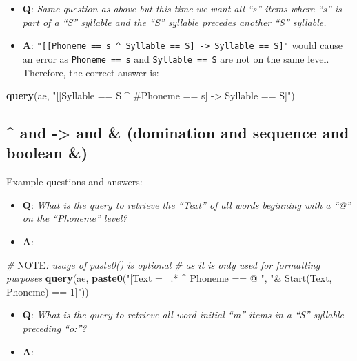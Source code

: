\documentclass[]{book}
\newenvironment{Shaded}{\begin{snugshade}}{\end{snugshade}}
\newcommand{\AlertTok}[1]{\textcolor[rgb]{0.94,0.16,0.16}{#1}}
\newcommand{\CommentTok}[1]{\textcolor[rgb]{0.56,0.35,0.01}{\textit{#1}}}
\newcommand{\KeywordTok}[1]{\textcolor[rgb]{0.13,0.29,0.53}{\textbf{#1}}}
\newcommand{\NormalTok}[1]{#1}
\newcommand{\StringTok}[1]{\textcolor[rgb]{0.31,0.60,0.02}{#1}}
\providecommand{\tightlist}{%
  \setlength{\itemsep}{0pt}\setlength{\parskip}{0pt}}
\begin{document}
\begin{itemize}
\tightlist
\item
  \textbf{Q}: \emph{Same question as above but this time we want all ``s'' items where ``s'' is part of a ``S'' syllable and the ``S'' syllable precedes another ``S'' syllable.}
\item
  \textbf{A}:
  \texttt{"{[}{[}Phoneme\ ==\ s\ \^{}\ Syllable\ ==\ S{]}\ -\textgreater{}\ Syllable\ ==\ S{]}"} would cause an error as \texttt{Phoneme\ ==\ s} and \texttt{Syllable\ ==\ S} are not on the same level. Therefore, the correct answer is:
\end{itemize}

\begin{Shaded}
\begin{Highlighting}[]
\KeywordTok{query}\NormalTok{(ae, }\StringTok{"[[Syllable == S ^ #Phoneme == s] -> Syllable == S]"}\NormalTok{)}
\end{Highlighting}
\end{Shaded}

\hypertarget{and---and-domination-and-sequence-and-boolean}{%
\subsection{\^{} and -\textgreater{} and \& (domination and sequence and boolean \&)}\label{and---and-domination-and-sequence-and-boolean}}

Example questions and answers:

\begin{itemize}
\tightlist
\item
  \textbf{Q}: \emph{What is the query to retrieve the ``Text'' of all words beginning with a ``@'' on the ``Phoneme'' level?}
\item
  \textbf{A}:
\end{itemize}

\begin{Shaded}
\begin{Highlighting}[]
\CommentTok{# }\AlertTok{NOTE}\CommentTok{: usage of paste0() is optional}
\CommentTok{# as it is only used for formatting purposes}
\KeywordTok{query}\NormalTok{(ae, }\KeywordTok{paste0}\NormalTok{(}\StringTok{"[Text =~ .* ^ Phoneme == @ "}\NormalTok{,}
                 \StringTok{"& Start(Text, Phoneme) == 1]"}\NormalTok{))}
\end{Highlighting}
\end{Shaded}

\begin{itemize}
\tightlist
\item
  \textbf{Q}: \emph{What is the query to retrieve all word-initial ``m'' items in a ``S'' syllable preceding ``o:''?}
\item
  \textbf{A}:
\end{itemize}
\end{document}
